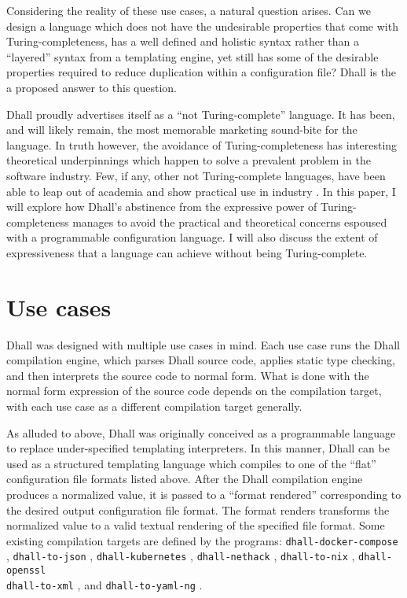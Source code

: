 \documentclass[12pt]{diazessay}
\begin{document}
Considering the reality of these use cases, a natural question arises.
Can we design a language which does not have the undesirable properties that come with Turing-completeness, has a well defined and holistic syntax rather than a ``layered'' syntax from a templating engine, yet still has some of the desirable properties required to reduce duplication within a configuration file? Dhall is the a proposed answer to this question.

Dhall proudly advertises itself as a ``not Turing-complete'' language.
It has been, and will likely remain, the most memorable marketing sound-bite for the language.
In truth however, the avoidance of Turing-completeness has interesting theoretical underpinnings which happen to solve a prevalent problem in the software industry.
Few, if any, other not Turing-complete languages, have been able to leap out of academia and show practical use in industry \cite{CoFu92,hammond2003hume, mcbride2004epigram}.
In this paper, I will explore how Dhall's abstinence from the expressive power of Turing-completeness manages to avoid the practical and theoretical concerns espoused with a programmable configuration language.
I will also discuss the extent of expressiveness that a language can achieve without being Turing-complete.

\section*{Use cases}

Dhall was designed with multiple use cases in mind.
Each use case runs the Dhall compilation engine, which parses Dhall source code, applies static type checking, and then interprets the source code to normal form.
What is done with the normal form expression of the source code depends on the compilation target, with each use case as a different compilation target generally.

As alluded to above, Dhall was originally conceived as a programmable language to replace under-specified templating interpreters.
In this manner, Dhall can be used as a structured templating language which compiles to one of the ``flat'' configuration file formats listed above.
After the Dhall compilation engine produces a normalized value, it is passed to a ``format rendered'' corresponding to the desired output configuration file format.
The format renders transforms the normalized value to a valid textual rendering of the specified file format.
Some existing compilation targets are defined by the programs: \texttt{dhall-docker-compose} \cite{DhallDocker}, \texttt{dhall-to-json} \cite{DhallJSON}, \texttt{dhall-kubernetes} \cite{DhallKubernetes}, \texttt{dhall-nethack} \cite{DhallNethack}, \texttt{dhall-to-nix} \cite{DhallNix}, \texttt{dhall-openssl} \cite{DhallOpenSSL} \\ \texttt{dhall-to-xml} \cite{DhallXML}, and \texttt{dhall-to-yaml-ng} \cite{DhallYAML}.
\end{document}
